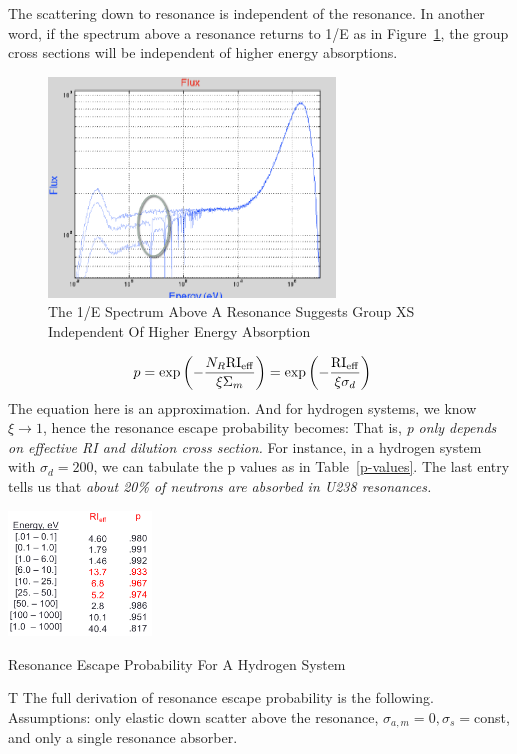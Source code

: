 \documentclass{school-22.211-notes}
\begin{document}
The scattering down to resonance is independent of the resonance. In another word, if the spectrum above a resonance returns to 1/E as in Figure~\ref{1overE}, the group cross sections will be independent of higher energy absorptions. 
\begin{figure}
  \centering
  \includegraphics[width=3in]{images/resonance-1-over-E.png}
  \caption{The 1/E Spectrum Above A Resonance Suggests Group XS Independent Of Higher Energy Absorption} \label{1overE}
\end{figure}

\begin{align}
p &= \exp \left( - \frac{N_R \mathrm{RI}_{\mathrm{eff}}}{\xi \Sigma_m} \right)  = \exp \left( - \frac{\mathrm{RI}_{\mathrm{eff}}}{\xi \sigma_d} \right)
\end{align}
The equation here is an approximation. And for hydrogen systems, we know $\xi \to 1$, hence the resonance escape probability becomes:
That is, \textit{p only depends on effective RI and dilution cross section.} For instance, in a hydrogen system with $\sigma_d = 200$, we can tabulate the p values as in Table~\ref{p-values}. The last entry tells us that \textit{about 20\% of neutrons are absorbed in U238 resonances.}
\begin{table}
  \centering
  \includegraphics[width=1.5in]{images/resonance-escape-probability.png}
  \caption{Resonance Escape Probability For A Hydrogen System} \label{p-values}
\end{table}
T
The full derivation of resonance escape probability is the following. Assumptions: only elastic down scatter above the resonance, $\sigma_{a,m} = 0, \sigma_{s} = $const, and only a single resonance absorber. 
\end{document}
